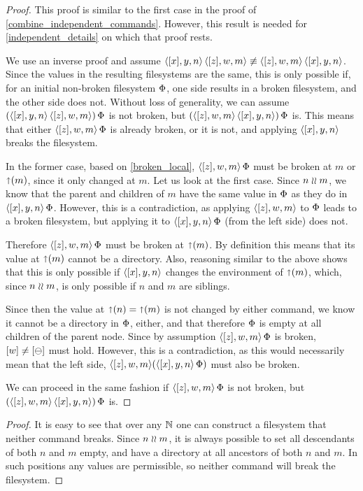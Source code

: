 \begin{proof}
This proof is similar to the first case in the proof of \cref{combine_independent_commands}.
However, this result is needed for \cref{independent_details} on which that proof rests.

We use an inverse proof and assume $\langle{[x],y,n}\rangle\,\langle{[z],w,m}\rangle \not\equiv \langle{[z],w,m}\rangle\,\langle{[x],y,n}\rangle$.
Since the values in the resulting filesystems are the same,
this is only possible if, for an initial non-broken filesystem $\Phi$,
one side results in a broken filesystem, and the other side does not.
Without loss of generality, we can assume
$(\langle{[x],y,n}\rangle\,\langle{[z],w,m}\rangle)\,\Phi$ is not broken, but $(\langle{[z],w,m}\rangle\,\langle{[x],y,n}\rangle)\,\Phi$ is.
This means that either $\langle{[z],w,m}\rangle\,\Phi$ is already broken, or it is not, and applying $\langle{[x],y,n}\rangle$
breaks the filesystem.

In the former case, based on \cref{broken_local}, 
$\langle{[z],w,m}\rangle\,\Phi$ must be broken at $m$ or $\mathord{\shortuparrow}({m})$, since it only changed at $m$.
Let us look at the first case.
Since $n\mathrel{\wr\wr} m$, we know that the parent and children of $m$ have the same value
in $\Phi$ as they do in $\langle{[x],y,n}\rangle\,\Phi$. However, this is a contradiction,
as applying $\langle{[z],w,m}\rangle$ to $\Phi$ leads to a broken filesystem,
but applying it to $\langle{[x],y,n}\rangle\,\Phi$ (from the left side) does not.

Therefore $\langle{[z],w,m}\rangle\,\Phi$ must be broken at $\mathord{\shortuparrow}({m})$.
By definition this means that its value at $\mathord{\shortuparrow}({m})$ cannot be a directory.
Also, reasoning similar to the above shows that this is only possible if $\langle{[x],y,n}\rangle$ changes
the environment of $\mathord{\shortuparrow}({m})$, which, since $n\mathrel{\wr\wr} m$, is only possible
if $n$ and $m$ are siblings.

Since then the value at $\mathord{\shortuparrow}({n})=\mathord{\shortuparrow}({m})$ is not changed by either command,
we know it cannot be a directory in $\Phi$, either, and that therefore
$\Phi$ is empty at all children of the parent node.
Since by assumption $\langle{[z],w,m}\rangle\,\Phi$ is broken, $[w]\neq[\ominus]$ must hold.
However, this is a contradiction, as this would necessarily mean that
the left side, $\langle{[z],w,m}\rangle(\langle{[x],y,n}\rangle\,\Phi)$ must also be broken.

We can proceed in the same fashion if $\langle{[z],w,m}\rangle\,\Phi$ is not broken, but
$(\langle{[z],w,m}\rangle\,\langle{[x],y,n}\rangle)\,\Phi$ is.
\end{proof}

\begin{myaxproof}
\axaxseparatenobreaks
\end{myaxproof}

\begin{proof}
It is easy to see that over any $\mathbb{N}$ one can construct a filesystem that neither command breaks.
Since $n\mathrel{\wr\wr} m$, it is always possible to set all descendants of both $n$ and $m$ empty,
and have a directory at all ancestors of both $n$ and $m$. In such positions any values are permissible,
so neither command will break the filesystem.
\end{proof}


